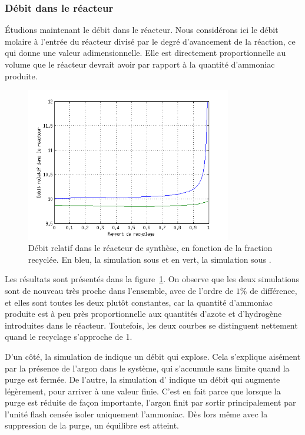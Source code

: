 \subsubsection{Débit dans le réacteur}

Étudions maintenant le débit dans le réacteur.
Nous considérons ici le débit molaire à l'entrée du réacteur
divisé par le degré d'avancement de la réaction, ce qui donne une valeur
adimensionnelle.
Elle est directement proportionnelle au volume que le réacteur devrait
avoir par rapport à la quantité d'ammoniac produite.

\begin{figure}
    \centering
    \includegraphics[width=0.8\textwidth]{img/in-reac}
    \caption{
        Débit relatif dans le réacteur de synthèse,
        en fonction de la fraction recyclée.
        En bleu, la simulation sous \matlab{} et en vert,
        la simulation sous \aspen{}.
    }
    \label{fig:in-reac}
\end{figure}

Les résultats sont présentés dans la figure~\ref{fig:in-reac}.
On observe que les deux simulations sont de nouveau très proche
dans l'ensemble, avec de l'ordre de $1\%$ de différence,
et elles sont toutes les deux plutôt constantes,
car la quantité d'ammoniac produite est à peu près proportionnelle aux
quantités d'azote et d'hydrogène introduites dans le réacteur.
Toutefois, les deux courbes se distinguent nettement quand
le recyclage s'approche de 1.

D'un côté, la simulation de \matlab{} indique un débit qui explose.
Cela s'explique aisément par la présence de l'argon dans le système,
qui s'accumule sans limite quand la purge est fermée.
De l'autre, la simulation d'\aspen{} indique un débit qui augmente légèrement,
pour arriver à une valeur finie. C'est en fait parce que lorsque
la purge est réduite de façon importante, l'argon finit par sortir
principalement par l'unité flash censée isoler uniquement l'ammoniac.
Dès lors même avec la suppression de la purge, un équilibre est atteint.

